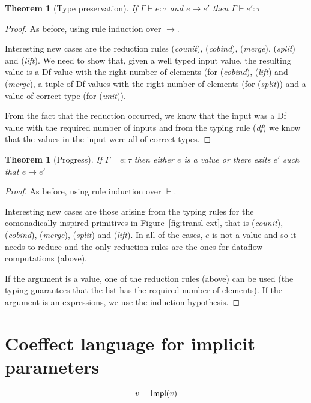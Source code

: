 \documentclass[
		twoside,openright,titlepage,numbers=noenddot,headinclude,%
                footinclude=true,cleardoublepage=empty,
                BCOR=10mm,paper=a4,fontsize=10pt, %
                ngerman,american, %
                ]{scrreprt}
\newcounter{mythmcounter}
\newtheorem{theorem}[mythmcounter]{Theorem}
\newcommand{\ident}[1]{\textnormal{\sffamily #1}}
\begin{document}
\begin{theorem}[Type preservation]
  If $\Gamma \vdash e : \tau$ and $e \rightarrow e'$ then $\Gamma \vdash e' : \tau$
\end{theorem}
\begin{proof}
As before, using rule induction over $\rightarrow$.

Interesting new cases are the reduction rules (\emph{counit}), (\emph{cobind}), (\emph{merge}),
(\emph{split}) and (\emph{lift}). We need to show that, given a well typed input value, the resulting
value is a \ident{Df} value with the right number of elements (for (\emph{cobind}), (\emph{lift}) and (\emph{merge}),
a tuple of \ident{Df} values with the right number of elements (for (\emph{split})) and a value
of correct type (for (\emph{unit})).

From the fact that the reduction occurred, we know that the input was a \ident{Df} value with the
required number of inputs and from the typing rule (\emph{df}) we know that the values in the input
were all of correct types.  
\end{proof}

\begin{theorem}[Progress]
  If $\Gamma \vdash e : \tau$ then either $e$ is a value or there exits $e'$ such that $e \rightarrow e'$
\end{theorem}
\begin{proof}
  As before, using rule induction over $\vdash$.

Interesting new cases are those arising from the typing rules for the comonadically-inspired
primitives in Figure~\ref{fig:transl-ext}, that is (\emph{counit}), (\emph{cobind}), (\emph{merge}),
(\emph{split}) and (\emph{lift}).  
In all of the cases, $e$ is not a value and so it needs to reduce and the only reduction rules
are the ones for dataflow computations (above). 

If the argument is a value, one of the reduction rules (above) can be used (the typing guarantees
that the list has the required number of elements). If the argument is an expressions, we use 
the induction hypothesis.
\end{proof}

\newpage
\section{Coeffect language for implicit parameters}

\begin{equation*}
v = \ident{Impl}(v)
\end{equation*}
\end{document}
